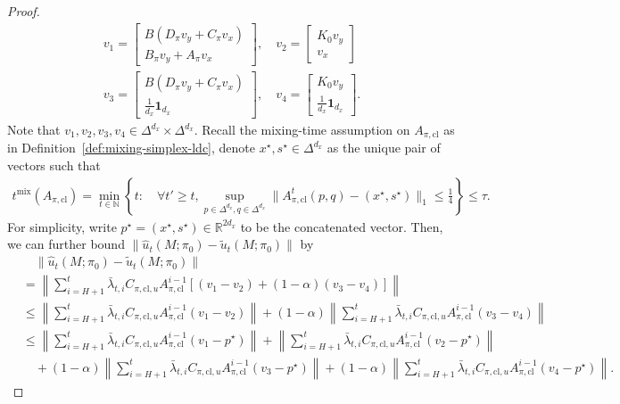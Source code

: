 \begin{proof}
\begin{align*}
v_1=\begin{bmatrix}
    B(D_{\pi}v_y+C_{\pi}v_x) \\ B_{\pi}v_y+A_{\pi}v_x
\end{bmatrix}, \quad v_2=\begin{bmatrix}
    K_0 v_y \\ v_x
\end{bmatrix}\\
v_3=\begin{bmatrix}
    B(D_{\pi}v_y+C_{\pi}v_x) \\ \frac{1}{d_x}\mathbf{1}_{d_x}
\end{bmatrix}, \quad v_4 = \begin{bmatrix}
    K_0 v_y \\ \frac{1}{d_x}\mathbf{1}_{d_x}
\end{bmatrix}.
\end{align*}
Note that $v_1, v_2, v_3, v_4\in\Delta^{d_x}\times \Delta^{d_x}$. Recall the mixing-time assumption on $A_{\pi,\mathrm{cl}}$ as in Definition~\ref{def:mixing-simplex-ldc}, denote $x^{\star}, s^{\star}\in\Delta^{d_x}$ as the unique pair of vectors such that 
\begin{align*}
t^{\mathrm{mix}}(A_{\pi,\mathrm{cl}})=\min_{t\in\mathbb{N}}\left\{t: \quad \forall t'\ge t, \sup_{p\in\Delta^{d_x},q\in\Delta^{d_x}}\|A_{\pi,\mathrm{cl}}^t(p,q)-(x^{\star},s^{\star})\|_1\le \frac{1}{4}\right\}\le \tau.
\end{align*}
For simplicity, write $p^{\star}=(x^{\star}, s^{\star})\in\mathbb{R}^{2d_x}$ to be the concatenated vector.
Then, we can further bound $\|\hat{u}_t(M;\pi_0)-\tilde{u}_t(M;\pi_0)\|$ by
\begin{align*}
&\quad \|\hat{u}_t(M;\pi_0)-\tilde{u}_t(M;\pi_0)\|\\
&=\left\|\sum_{i=H+1}^t \bar{\lambda}_{t,i}C_{\pi,\mathrm{cl},u}A_{\pi,\mathrm{cl}}^{i-1}[(v_1-v_2)+(1-\alpha)(v_3-v_4)]\right\|\\
&\le \left\|\sum_{i=H+1}^t \bar{\lambda}_{t,i}C_{\pi,\mathrm{cl},u}A_{\pi,\mathrm{cl}}^{i-1}(v_1-v_2)\right\| + (1-\alpha)\left\|\sum_{i=H+1}^t \bar{\lambda}_{t,i}C_{\pi,\mathrm{cl},u}A_{\pi,\mathrm{cl}}^{i-1}(v_3-v_4)\right\|\\
&\le \left\|\sum_{i=H+1}^t \bar{\lambda}_{t,i}C_{\pi,\mathrm{cl},u}A_{\pi,\mathrm{cl}}^{i-1}(v_1-p^{\star})\right\| + \left\|\sum_{i=H+1}^t \bar{\lambda}_{t,i}C_{\pi,\mathrm{cl},u}A_{\pi,\mathrm{cl}}^{i-1}(v_2-p^{\star})\right\|\\
&\quad + (1-\alpha)\left\|\sum_{i=H+1}^t \bar{\lambda}_{t,i}C_{\pi,\mathrm{cl},u}A_{\pi,\mathrm{cl}}^{i-1}(v_3-p^{\star})\right\|+ (1-\alpha)\left\|\sum_{i=H+1}^t \bar{\lambda}_{t,i}C_{\pi,\mathrm{cl},u}A_{\pi,\mathrm{cl}}^{i-1}(v_4-p^{\star})\right\|.

\end{align*}
\end{proof}
